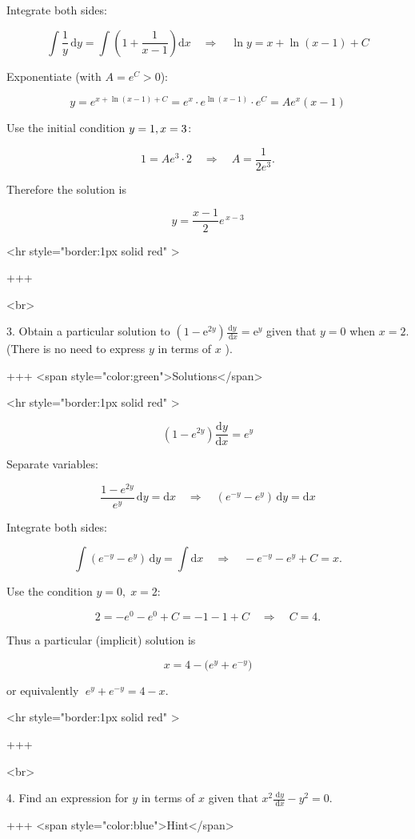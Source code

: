 Integrate both sides:

$$
\int\frac{1}{y}\,\mathrm{d}y=\int\left(1+\frac{1}{x-1}\right)\mathrm{d}x
\quad\Rightarrow\quad
\ln y = x+\ln(x-1)+C
$$

Exponentiate (with $A=e^{C}>0$):

$$
y = e^{x+\ln(x-1)+C}=e^x\cdot e^{\ln{(x-1)}}\cdot e^C= A e^{x}(x-1)
$$

Use the initial condition $y=1,\space x=3$:

$$
1 = A e^{3}\cdot 2 \quad\Rightarrow\quad A=\frac{1}{2e^{3}}.
$$

Therefore the solution is

$$
y=\frac{x-1}{2}e^{\,x-3}
$$

<hr style="border:1px solid red" >

+++

<br>

3. Obtain a particular solution to $\left(1-\mathrm{e}^{2 y}\right) \frac{\mathrm{d} y}{\mathrm{~d} x}=\mathrm{e}^{y}$ given that $y=0$ when $x=2$.
(There is no need to express $y$ in terms of $x$ ).

+++ <span style="color:green">Solutions</span>

<hr style="border:1px solid red" >

$$
(1-e^{2y})\frac{\mathrm{d}y}{\mathrm{d}x}=e^{y}
$$


Separate variables:

$$
\frac{1-e^{2y}}{e^{y}}\,\mathrm{d}y=\mathrm{d}x
\quad\Rightarrow\quad
(e^{-y}-e^{y})\,\mathrm{d}y=\mathrm{d}x
$$


Integrate both sides:

$$
\int (e^{-y}-e^{y})\,\mathrm{d}y=\int \mathrm{d}x
\quad\Rightarrow\quad
- e^{-y}-e^{y}+C=x.
$$


Use the condition $y=0,\;x=2$:

$$
2=-e^{0}-e^{0}+C=-1-1+C\quad\Rightarrow\quad C=4.
$$


Thus a particular (implicit) solution is

$$
x=4-\bigl(e^{y}+e^{-y}\bigr)
$$

or equivalently $\;e^{y}+e^{-y}=4-x$.

<hr style="border:1px solid red" >

+++

<br>

4. Find an expression for $y$ in terms of $x$ given that $x^{2} \frac{\mathrm{~d} y}{\mathrm{~d} x}-y^{2}=0$.

+++ <span style="color:blue">Hint</span>

